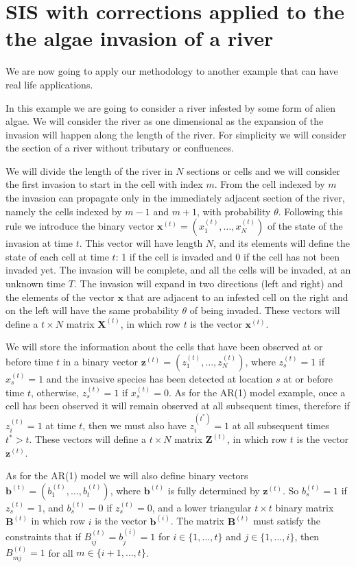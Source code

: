 \documentclass[11pt,a4paper]{article}
\renewcommand{\vec}[1]{\mathbf{#1}}
\begin{document}
\section{SIS with corrections applied to the the algae invasion of a river}

We are now going to apply our methodology to another example that can have real life applications. 

In this example we are going to consider a river infested by some form of alien algae. We will consider the river as one dimensional as the expansion of the invasion will happen along the length of the river. For simplicity we will consider the section of a river without tributary or confluences. 

We will divide the length of the river in $N$ sections or cells and we will consider the first invasion to start in the cell with index $m$.
From the cell indexed by $m$ the invasion can propagate only in the immediately adjacent section of the river, namely the cells indexed by $m-1$ and $m+1$, with probability $\theta$. Following this rule we introduce the binary vector $\vec{x}^{(t)} = (x_1^{(t)}, \dots, x_{N}^{(t)})$ of the state of the invasion at time $t$. This vector will have length $N$, and its elements will define the state of each cell at time $t$: 1 if the cell is invaded and 0 if the cell has not been invaded yet. The invasion will be complete, and all the cells will be invaded, at an unknown time $T$. 
The invasion will expand in two directions (left and right) and the elements of the vector $\vec{x}$ that are adjacent to an infested cell on the right and on the left will have the same probability $\theta$ of being invaded. These vectors will define a $t\times N$ matrix $\vec{X}^{(t)}$, in which row $t$ is the vector $\vec{x}^{(t)}$. 

We will store the information about the cells that have been observed at or before time $t$ in a binary vector $\vec{z}^{(t)} = (z_1^{(t)}, \dots, z_{N}^{(t)})$, where $z_s^{(t)} = 1$ if $x_s^{(t)} = 1$ and the invasive species has been detected at location $s$ at or before time $t$, otherwise, $z_s^{(t)} = 1$ if $x_s^{(t)} = 0$. As for the AR(1) model example, once a cell has been observed it will remain observed at all subsequent times, therefore if $z_i^{(t)} = 1$ at time $t$, then we must also have $z_i^{(t^{*})} = 1$ at all subsequent times $t^{*} > t$. These vectors will define a $t\times N$ matrix $\vec{Z}^{(t)}$, in which row $t$ is the vector $\vec{z}^{(t)}$.

As for the AR(1) model we will also define binary vectors $\vec{b}^{(t)} = (b_1^{(t)}, \dots, b_{t}^{(t)})$, where $\vec{b}^{(t)}$ is fully determined by $\vec{z}^{(t)}$. So $b_s^{(t)} = 1$ if $z_s^{(t)} = 1$, and $b_s^{(t)} = 0$ if $z_s^{(t)} = 0$, and a lower triangular $t \times t$ binary matrix $\vec{B}^{(t)}$ in which row $i$ is the vector $\vec{b}^{(i)}$.
The matrix $\vec{B}^{(t)}$ must satisfy the constraints that if $B_{ij}^{(t)} = b_j^{(i)} = 1$ for $i \in \{ 1, \ldots, t \}$ and $j \in \{ 1, \ldots, i \}$, then $B_{mj}^{(t)} = 1$ for all $m \in \{ i+1, \ldots, t \}$.
\end{document}

